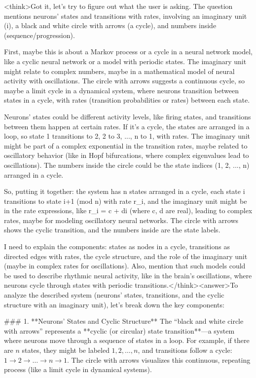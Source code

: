 <think>Got it, let's try to figure out what the user is asking. The question mentions neurons' states and transitions with rates, involving an imaginary unit (i), a black and white circle with arrows (a cycle), and numbers inside (sequence/progression). 

First, maybe this is about a Markov process or a cycle in a neural network model, like a cyclic neural network or a model with periodic states. The imaginary unit might relate to complex numbers, maybe in a mathematical model of neural activity with oscillations. The circle with arrows suggests a continuous cycle, so maybe a limit cycle in a dynamical system, where neurons transition between states in a cycle, with rates (transition probabilities or rates) between each state.

Neurons' states could be different activity levels, like firing states, and transitions between them happen at certain rates. If it's a cycle, the states are arranged in a loop, so state 1 transitions to 2, 2 to 3, ..., n to 1, with rates. The imaginary unit might be part of a complex exponential in the transition rates, maybe related to oscillatory behavior (like in Hopf bifurcations, where complex eigenvalues lead to oscillations). The numbers inside the circle could be the state indices (1, 2, ..., n) arranged in a cycle.

So, putting it together: the system has n states arranged in a cycle, each state i transitions to state i+1 (mod n) with rate r_i, and the imaginary unit might be in the rate expressions, like r_i = c + di (where c, d are real), leading to complex rates, maybe for modeling oscillatory neural networks. The circle with arrows shows the cyclic transition, and the numbers inside are the state labels.

I need to explain the components: states as nodes in a cycle, transitions as directed edges with rates, the cycle structure, and the role of the imaginary unit (maybe in complex rates for oscillations). Also, mention that such models could be used to describe rhythmic neural activity, like in the brain's oscillations, where neurons cycle through states with periodic transitions.</think><answer>To analyze the described system (neurons’ states, transitions, and the cyclic structure with an imaginary unit), let’s break down the key components:  


### 1. **Neurons’ States and Cyclic Structure**  
The “black and white circle with arrows” represents a **cyclic (or circular) state transition**—a system where neurons move through a sequence of states in a loop. For example, if there are \( n \) states, they might be labeled \( 1, 2, \dots, n \), and transitions follow a cycle: \( 1 \to 2 \to \dots \to n \to 1 \). The circle with arrows visualizes this continuous, repeating process (like a limit cycle in dynamical systems).  


